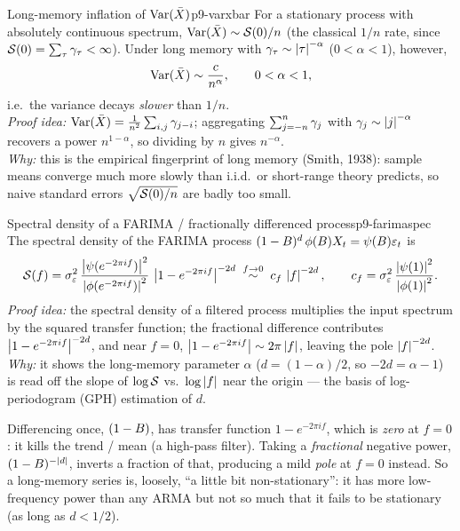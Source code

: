 \begin{proposition}{Long-memory inflation of $\operatorname{Var}(\bar X)$}{p9-varxbar}
For a stationary process with absolutely continuous spectrum,
$\operatorname{Var}(\bar X)\sim \mathcal{S}(0)/n$ (the classical $1/n$ rate, since
$\mathcal{S}(0)=\sum_\tau\gamma_\tau<\infty$). Under long memory with
$\gamma_\tau\sim\left\lvert \tau \right\rvert^{-\alpha}$ ($0<\alpha<1$), however,
\[
\operatorname{Var}(\bar X) \sim \frac{c}{n^{\alpha}},\qquad 0<\alpha<1 ,
\]
i.e.\ the variance decays \emph{slower} than $1/n$.\\
\textit{Proof idea:} $\operatorname{Var}(\bar X)=\frac1{n^2}\sum_{i,j}\gamma_{j-i}$; aggregating
$\sum_{j=-n}^{n}\gamma_j$ with $\gamma_j\sim\left\lvert j \right\rvert^{-\alpha}$ recovers a power
$n^{1-\alpha}$, so dividing by $n$ gives $n^{-\alpha}$.\\
\textit{Why:} this is the empirical fingerprint of long memory (Smith, 1938):
sample means converge much more slowly than i.i.d.\ or short-range theory
predicts, so naive standard errors $\sqrt{\mathcal{S}(0)/n}$ are badly too small.
\end{proposition}

\begin{theorem}{Spectral density of a FARIMA / fractionally differenced process}{p9-farimaspec}
The spectral density of the FARIMA process
$(1-B)^d\,\phi(B)X_t=\psi(B)\varepsilon_t$ is
\[
\mathcal{S}(f) = \sigma_\varepsilon^2\,
\frac{\left\lvert \psi(e^{-2\pi i f}) \right\rvert^2}{\left\lvert \phi(e^{-2\pi i f}) \right\rvert^2}\,
\left\lvert 1-e^{-2\pi i f} \right\rvert^{-2d}
\;\overset{f\to0}{\sim}\; c_f\,\left\lvert f \right\rvert^{-2d},
\qquad
c_f = \sigma_\varepsilon^2\,\frac{\left\lvert \psi(1) \right\rvert^2}{\left\lvert \phi(1) \right\rvert^2}.
\]
\textit{Proof idea:} the spectral density of a filtered process multiplies the
input spectrum by the squared transfer function; the fractional difference
contributes $\left\lvert 1-e^{-2\pi i f} \right\rvert^{-2d}$, and near $f=0$,
$\left\lvert 1-e^{-2\pi i f} \right\rvert\sim 2\pi\left\lvert f \right\rvert$, leaving the pole $\left\lvert f \right\rvert^{-2d}$.\\
\textit{Why:} it shows the long-memory parameter $\alpha$ ($d=(1-\alpha)/2$, so
$-2d=\alpha-1$) is read off the slope of $\log\mathcal{S}$ vs.\ $\log\left\lvert f \right\rvert$ near the
origin --- the basis of log-periodogram (GPH) estimation of $d$.
\end{theorem}

\begin{intuition}
Differencing once, $(1-B)$, has transfer function $1-e^{-2\pi i f}$, which is
\emph{zero} at $f=0$: it kills the trend / mean (a high-pass filter). Taking a
\emph{fractional} negative power, $(1-B)^{-|d|}$, inverts a fraction of that,
producing a mild \emph{pole} at $f=0$ instead. So a long-memory series is, loosely,
``a little bit non-stationary'': it has more low-frequency power than any ARMA
but not so much that it fails to be stationary (as long as $d<1/2$).
\end{intuition}


